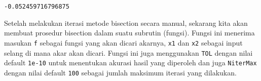 \documentclass[11pt]{article}
\makeatletter
\newcommand{\boxspacing}{\kern\kvtcb@left@rule\kern\kvtcb@boxsep}
\newcommand{\prompt}[4]{
        \ttfamily\llap{{\color{#2}[#3]:\hspace{3pt}#4}}\vspace{-\baselineskip}
    }
\makeatother
\begin{document}
            \begin{tcolorbox}[breakable, size=fbox, boxrule=.5pt, pad at break*=1mm, opacityfill=0]
\prompt{Out}{outcolor}{30}{\boxspacing}
\begin{Verbatim}[commandchars=\\\{\}]
-0.052459716796875
\end{Verbatim}
\end{tcolorbox}
        
    Setelah melakukan iterasi metode bisection secara manual, sekarang kita
akan membuat prosedur bisection dalam suatu subrutin (fungsi). Fungsi
ini menerima masukan \texttt{f} sebagai fungsi yang akan dicari akarnya,
\texttt{x1} dan \texttt{x2} sebagai input selang di mana akar akan
dicari. Fungsi ini juga menggunakan \texttt{TOL} dengan nilai default
\texttt{1e-10} untuk menentukan akurasi hasil yang diperoleh dan juga
\texttt{NiterMax} dengan nilai default \texttt{100} sebagai jumlah
maksimum iterasi yang dilakukan.
\end{document}
